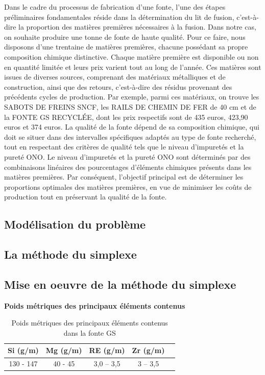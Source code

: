 \documentclass[12pt]{article}
\begin{document}
Dans le cadre du processus de fabrication d'une fonte, l'une des étapes préliminaires fondamentales
réside dans la détermination du lit de fusion, c'est-à-dire la proportion des matières premières
nécessaires à la fusion. Dans notre cas, on souhaite  produire une tonne de fonte de haute qualité.
Pour ce faire, nous disposons d'une trentaine de matières premières, chacune possédant sa propre
composition chimique distinctive. Chaque matière première est disponible ou non en quantité limitée
et leurs prix varient tout au long de l'année. Ces matières sont issues de diverses sources,
comprenant des matériaux métalliques et de construction, ainsi que des retours, c'est-à-dire
des résidus provenant des précédents cycles de production. Par exemple, parmi ces matériaux,
on trouve les SABOTS DE FREINS SNCF, les RAILS DE CHEMIN DE FER de 40 cm et de la FONTE GS RECYCLÉE,
dont les prix respectifs sont de 435 euros, 423,90 euros et 374 euros. La qualité de la fonte dépend
de sa composition chimique, qui doit se situer dans des intervalles spécifiques adaptés au type
de fonte recherché, tout en respectant des critères de qualité tels que le niveau d'impuretés et
la pureté ONO. Le niveau d'impuretés et la pureté ONO sont déterminés par des combinaisons linéaires
des pourcentages d'éléments chimiques présents dans les matières premières. Par conséquent,
l'objectif principal est de déterminer les proportions optimales des matières premières,
en vue de minimiser les coûts de production tout en préservant la qualité de la fonte.

\subsection{Modélisation du problème}

\subsection{La méthode du simplexe}

\subsection{Mise en oeuvre de la méthode du simplexe}

\begin{table}[H]
    \centering
    \textbf{Poids métriques des principaux éléments contenus}
    \begin{tabular}{|c|c|c|c|c|}
        \hline
        \textbf{Si (g/m)} & \textbf{Mg (g/m)} & \textbf{RE (g/m)} & \textbf{Zr (g/m)} \\
        \hline
        130 - 147 & 40 - 45 & 3,0 – 3,5 & 3 – 3,5 \\
        \hline
    \end{tabular}
    \caption{Poids métriques des principaux éléments contenus dans la fonte GS}
    \label{tab:poids_elements}
\end{table}
\end{document}

